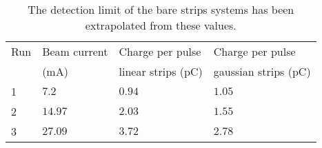 \begin{table}[!h]
  \centering
  \caption[The detection limit of the bare strips systems has been extrapolated from these values]{The detection limit of the bare strips systems has been extrapolated from these values.}
  \label{chap4:tab:limit}
  \begin{tabularx}{1\textwidth}{lXXX}
    \toprule
    Run & Beam current    & Charge per pulse              & Charge per pulse                \\
        & ($\mathrm{mA}$) & linear strips ($\mathrm{pC}$) & gaussian strips ($\mathrm{pC}$) \\
    \midrule
    1   & $7.2$           & $0.94$                        & $1.05$                          \\
    2   & $14.97$         & $2.03$                        & $1.55$                          \\
    3   & $27.09$         & $3.72$                        & $2.78$                          \\

    \bottomrule
  \end{tabularx}
\end{table}